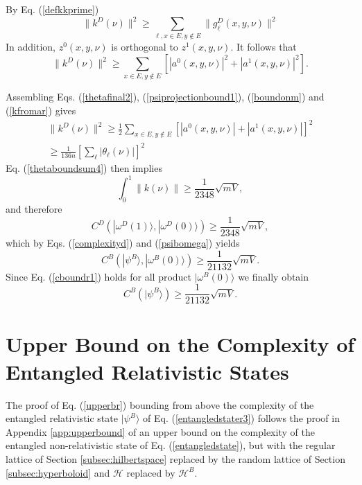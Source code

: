 \documentclass[twocolumn,amsmath,amssymb]{revtex4-1}
\begin{document}
By Eq. (\ref{defkkprime}) 
\begin{equation}
\label{kfroma0r}
\parallel k^D(\nu) \parallel ^ 2  \ge  \sum_{\ell, x \in E, y \notin E} \parallel g^D_\ell( x, y, \nu) \parallel^2
\end{equation}
In addition, $z^0(x,y,\nu)$ is orthogonal
to $z^1(x, y, \nu)$. It follows that
\begin{equation}
\label{kfromar}
\parallel k^D(\nu) \parallel^2 \ge \sum_{x \in E, y \notin E} [|a^0(x,y,\nu)|^2 + |a^1(x,y,\nu)|^2].
\end{equation}

Assembling Eqs. (\ref{thetafinal2}), (\ref{psiprojectionbound1}), (\ref{boundonm})
and (\ref{kfromar}) gives
\begin{multline}
\label{kboundr}
\parallel k^D(\nu) \parallel^2 \ge \frac{1}{2} \sum_{x \in E, y \notin E} [|a^0(x,y,\nu)| + |a^1(x,y,\nu)|]^2 \\
\ge \frac{1}{136 n} [\sum_{\ell} |\theta_{\ell}(\nu)|] ^ 2
\end{multline}
Eq. (\ref{thetaboundsum4}) then implies
\begin{equation}
\label{kbound1r}
\int_0^1 \parallel k(\nu) \parallel \ge \frac{1}{2348} \sqrt{mV},
\end{equation}
and therefore
\begin{equation}
\label{cboundr}
C^D( |\omega^D(1) \rangle , |\omega^D(0) \rangle ) \ge \frac{1}{2348}\sqrt{ mV},
\end{equation}
which by Eqs. (\ref{complexityd}) and (\ref{psibomega}) yields
\begin{equation}
\label{cboundr1}
C^B( |\psi^B \rangle , |\omega^B(0) \rangle ) \ge \frac{1}{21132}\sqrt{ mV}.
\end{equation}
Since Eq. (\ref{cboundr1}) holds for all product $|\omega^B(0) \rangle $
we finally obtain
\begin{equation}
\label{cbound2r}
C^B( |\psi^B \rangle ) \ge \frac{1}{21132} \sqrt{ mV}.
\end{equation}




\section{\label{app:upperboundr} Upper Bound on the Complexity of Entangled Relativistic States}

The proof of Eq. (\ref{upperbr}) bounding from above the
complexity of the entangled relativistic state $|\psi^B \rangle $ of Eq. (\ref{entangledstater3}) 
follows the proof in Appendix \ref{app:upperbound} of an upper bound
on the complexity of the entangled non-relativistic state of Eq. (\ref{entangledstate}),
but with the regular lattice of Section \ref{subsec:hilbertspace} replaced by
the random lattice of Section \ref{subsec:hyperboloid} and
$\mathcal{H}$ replaced by $\mathcal{H}^B$.
\end{document}
